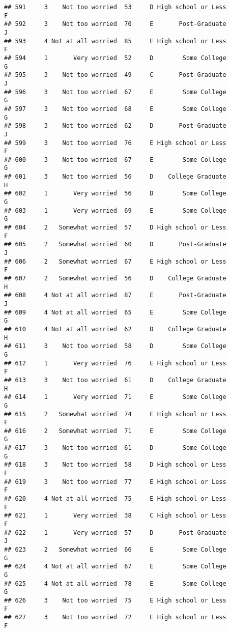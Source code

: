 \documentclass[
]{article}
\begin{document}
\begin{verbatim}
## 591     3    Not too worried  53     D High school or Less         F
## 592     3    Not too worried  70     E       Post-Graduate         J
## 593     4 Not at all worried  85     E High school or Less         F
## 594     1       Very worried  52     D        Some College         G
## 595     3    Not too worried  49     C       Post-Graduate         J
## 596     3    Not too worried  67     E        Some College         G
## 597     3    Not too worried  68     E        Some College         G
## 598     3    Not too worried  62     D       Post-Graduate         J
## 599     3    Not too worried  76     E High school or Less         F
## 600     3    Not too worried  67     E        Some College         G
## 601     3    Not too worried  56     D    College Graduate         H
## 602     1       Very worried  56     D        Some College         G
## 603     1       Very worried  69     E        Some College         G
## 604     2   Somewhat worried  57     D High school or Less         F
## 605     2   Somewhat worried  60     D       Post-Graduate         J
## 606     2   Somewhat worried  67     E High school or Less         F
## 607     2   Somewhat worried  56     D    College Graduate         H
## 608     4 Not at all worried  87     E       Post-Graduate         J
## 609     4 Not at all worried  65     E        Some College         G
## 610     4 Not at all worried  62     D    College Graduate         H
## 611     3    Not too worried  58     D        Some College         G
## 612     1       Very worried  76     E High school or Less         F
## 613     3    Not too worried  61     D    College Graduate         H
## 614     1       Very worried  71     E        Some College         G
## 615     2   Somewhat worried  74     E High school or Less         F
## 616     2   Somewhat worried  71     E        Some College         G
## 617     3    Not too worried  61     D        Some College         G
## 618     3    Not too worried  58     D High school or Less         F
## 619     3    Not too worried  77     E High school or Less         F
## 620     4 Not at all worried  75     E High school or Less         F
## 621     1       Very worried  38     C High school or Less         F
## 622     1       Very worried  57     D       Post-Graduate         J
## 623     2   Somewhat worried  66     E        Some College         G
## 624     4 Not at all worried  67     E        Some College         G
## 625     4 Not at all worried  78     E        Some College         G
## 626     3    Not too worried  75     E High school or Less         F
## 627     3    Not too worried  72     E High school or Less         F

\end{verbatim}
\end{document}

